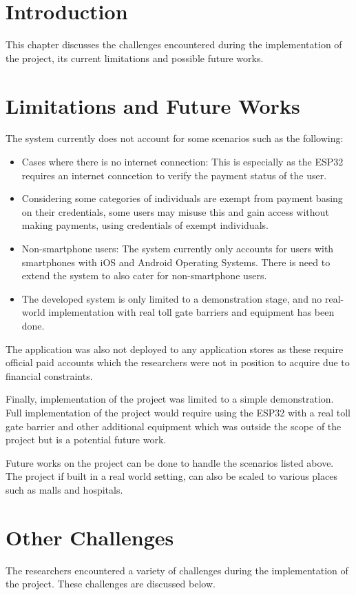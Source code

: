 \section{Introduction}
This chapter discusses the challenges encountered during the implementation of the project, its current limitations and possible future works.


\section{Limitations and Future Works}
The system currently does not account for some scenarios such as the following:
\begin{itemize}
    \item Cases where there is no internet connection: This is especially as the ESP32 requires an internet conncetion to verify the payment status of the user.
    \item Considering some categories of individuals are exempt from payment basing on their credentials, some users may misuse this and gain access without making payments, using credentials of exempt individuals.
    \item Non-smartphone users: The system currently only accounts for users with smartphones with iOS and Android Operating Systems. There is need to extend the system to also cater for non-smartphone users.
    \item The developed system is only limited to a demonstration stage, and no real-world implementation with real toll gate barriers and equipment has been done.
\end{itemize}

The application was also not deployed to any application stores as these require official paid accounts which the researchers were not in position to acquire due to financial constraints.

Finally, implementation of the project was limited to a simple demonstration. Full implementation of the project would require using the ESP32 with a real toll gate barrier and other additional equipment which was outside the scope of the project but is a potential future work.

Future works on the project can be done to handle the scenarios listed above. The project if built in a real world setting,  can also be scaled to various places such as malls and hospitals.


\section{Other Challenges}
The researchers encountered a variety of challenges during the implementation of the project. These challenges are discussed below.

